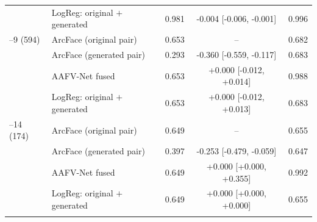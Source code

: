 \begin{table}[t]
{\begin{tabular}{@{}llccc@{}}
 & LogReg: original $+$ generated & 0.981 & -0.004 [-0.006, -0.001] & 0.996 \\
\addlinespace[1pt]
5--9 (594) & ArcFace (original pair) & 0.653 & -- & 0.682 \\
 & ArcFace (generated pair) & 0.293 & -0.360 [-0.559, -0.117] & 0.683 \\
 & AAFV-Net fused & 0.653 & +0.000 [-0.012, +0.014] & 0.988 \\
 & LogReg: original $+$ generated & 0.653 & +0.000 [-0.012, +0.013] & 0.683 \\
\addlinespace[1pt]
10--14 (174) & ArcFace (original pair) & 0.649 & -- & 0.655 \\
 & ArcFace (generated pair) & 0.397 & -0.253 [-0.479, -0.059] & 0.647 \\
 & AAFV-Net fused & 0.649 & +0.000 [+0.000, +0.355] & 0.992 \\
 & LogReg: original $+$ generated & 0.649 & +0.000 [+0.000, +0.000] & 0.655 \\
\addlinespace[1pt]
\bottomrule
\end{tabular}}
\end{table}
